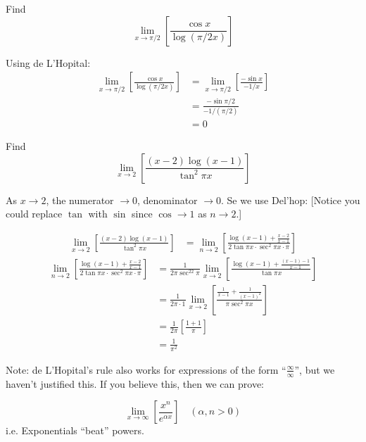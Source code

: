 \documentclass[10pt]{scrartcl}
\begin{document}
\begin{example}Find 
\[\lim_{x \to \pi/2} \left[\frac{\cos x}{\log(\pi/2x)}\right]\]

Using de L'Hopital:
\[
\begin{aligned}
  \lim_{x \to \pi/2} \left[\frac{\cos x}{\log(\pi/2x)}\right] &= \lim_{x \to \pi/2}\left[\frac{-\sin x}{-1/x}\right]\\
  &= \frac{-\sin\pi/2}{-1/(\pi/2)} \\ 
  &= 0 
\end{aligned}
\]
\end{example}\vspace*{5pt}





\begin{example}
Find 
\[\lim_{x \to 2} \left[\frac{(x-2)\log(x-1)}{\tan^2\pi x}\right]\]

As $x \to 2$, the numerator $\to 0$, denominator $\to 0$. Se we use Del'hop: [Notice you could replace $\tan$ with $\sin$ since $\cos \to 1$ as $n \to 2$.]

\begin{align*}
  \lim_{x \to 2} \left[\frac{(x-2)\log(x-1)}{\tan^2\pi x}\right] &= \lim_{n \to 2}\left[\frac{\log(x-1) + \frac{x-2}{x-1}}{2\tan\pi x\cdot \sec^2\pi x\cdot \pi}\right]
  \end{align*}
\begin{align*}
 \lim_{n \to 2}\left[\frac{\log(x-1) + \frac{x-2}{x-1}}{2\tan\pi x\cdot \sec^2\pi x\cdot \pi}\right]
  &= \frac{1}{2\pi\sec^22\pi} \lim_{x \to 2} \left[\frac{\log(x-1) + \frac{(x-1)-1}{x-1}}{\tan \pi x}\right]\\
  &= \frac{1}{2\pi \cdot 1}\lim_{x \to 2} \left[\frac{\frac{1}{x-1} + \frac{1}{(x-1)^2}}{\pi\sec^2\pi x}\right]\\
  &= \frac{1}{2\pi}\left[\frac{1 + 1}{\pi}\right]\\
  &= \frac{1}{\pi^2}
\end{align*}
\end{example}


Note: de L'Hopital's rule also works for expressions of the form ``$\frac{\infty}{\infty}$'', but we haven't justified this. If you believe this, then we can prove:
\begin{proposition} 
\[  \lim_{x \to \infty}\left[\frac{x^n}{e^{\alpha x}}\right] \quad (\alpha, n >0)\]
i.e. Exponentials ``beat'' powers. 
\end{proposition}
\end{document}
